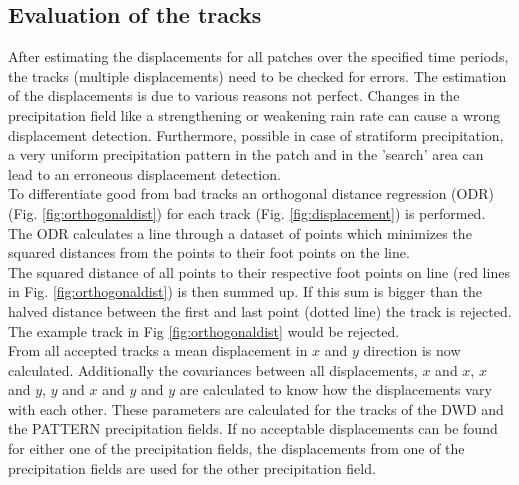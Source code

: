 \documentclass[11pt,twoside,a4paper,fleqn,x11names]{report}
\numberwithin{equation}{chapter}
\numberwithin{figure}{chapter}
\numberwithin{table}{chapter}
\begin{document}
\subsection{Evaluation of the tracks}
After estimating the displacements for all patches over the specified time periods, the tracks (multiple displacements) need to be checked for errors. The estimation of the displacements is due to various reasons not perfect. Changes in the precipitation field like a strengthening or weakening rain rate can cause a wrong displacement detection. Furthermore, possible in case of stratiform precipitation, a very uniform precipitation pattern in the patch and in the 'search' area can lead to an erroneous displacement detection.\\
To differentiate good from bad tracks an orthogonal distance regression (ODR) (Fig. \ref{fig:orthogonaldist}) for each track (Fig. \ref{fig:displacement}) is performed. The ODR calculates a line through a dataset of points which minimizes the squared distances from the points to their foot points on the line. \\
The squared distance of all points to their respective foot points on line (red lines in Fig. \ref{fig:orthogonaldist}) is then summed up. If this sum is bigger than the halved distance between the first and last point (dotted line) the track is rejected. The example track in Fig \ref{fig:orthogonaldist} would be rejected. \\
From all accepted tracks a mean displacement in $x$ and $y$ direction is now calculated. Additionally the covariances between all displacements, $x$ and $x$,  $x$ and $y$, $y$ and $x$ and $y$ and $y$ are calculated to know how the displacements vary with each other. These parameters are calculated for the tracks of the DWD and the PATTERN precipitation fields. 
If no acceptable displacements can be found for either one of the precipitation fields, the displacements from one of the precipitation fields are used for the other precipitation field.
\end{document}
